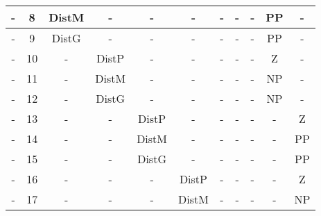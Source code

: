 \begin{table}[ht]
{\begin{tabular}{|c|c|c|c|c|c|c|c|c|c|c|}
-                                                                               & 8                 & DistM          & -              & -              & -              & -              & -      & -      & PP         & -          \\ \hline
-                                                                               & 9                 & DistG          & -              & -              & -              & -              & -      & -      & PP         & -          \\ \hline
-                                                                               & 10                & -              & DistP          & -              & -              & -              & -      & -      & Z          & -          \\ \hline
-                                                                               & 11                & -              & DistM          & -              & -              & -              & -      & -      & NP         & -          \\ \hline
-                                                                               & 12                & -              & DistG          & -              & -              & -              & -      & -      & NP         & -          \\ \hline
-                                                                               & 13                & -              & -              & DistP          & -              & -              & -      & -      & -          & Z          \\ \hline
-                                                                               & 14                & -              & -              & DistM          & -              & -              & -      & -      & -          & PP         \\ \hline
-                                                                               & 15                & -              & -              & DistG          & -              & -              & -      & -      & -          & PP         \\ \hline
-                                                                               & 16                & -              & -              & -              & DistP          & -              & -      & -      & -          & Z          \\ \hline
-                                                                               & 17                & -              & -              & -              & DistM          & -              & -      & -      & -          & NP         \\ \hline

\end{tabular}}
\end{table}
